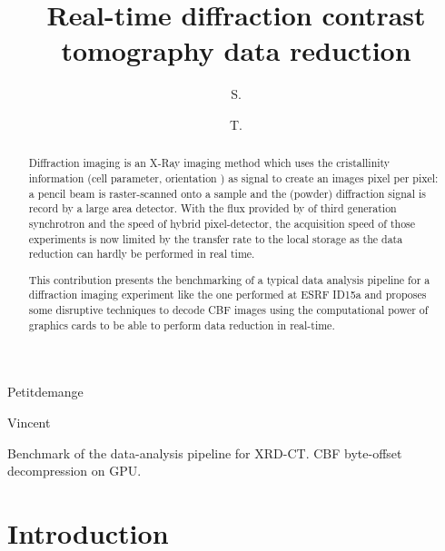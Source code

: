 \documentclass[preprint]{iucr}              %
\begin{document}

 \title{Real-time diffraction contrast tomography data reduction}

 \author[a]{S.}{Petitdemange}
 \author[a]{T.}{Vincent}
  





\maketitle                        %

\begin{synopsis}
Benchmark of the data-analysis pipeline for XRD-CT. CBF byte-offset
decompression on GPU.
\end{synopsis}

\begin{abstract}

Diffraction imaging is an X-Ray imaging method which uses the cristallinity
information (cell parameter, orientation ) as signal to create an images pixel
per pixel:
a pencil beam is raster-scanned onto a sample and the (powder) diffraction
signal is record by a large area detector. 
With the flux provided by of third generation synchrotron and the speed of
hybrid pixel-detector, the acquisition speed of those experiments is now 
limited by the transfer rate to the local storage as the data reduction can
hardly be performed in real time.

This contribution presents the benchmarking of a typical data
analysis pipeline for a diffraction imaging experiment like the one performed at
ESRF ID15a and proposes some disruptive techniques to decode CBF images using the
computational power of graphics cards to be able to perform data reduction in
real-time.
\end{abstract}


\section{Introduction}
\end{document}
